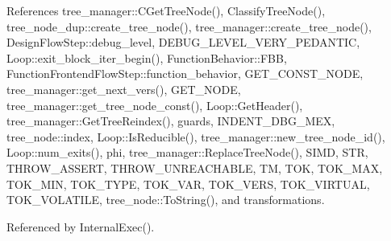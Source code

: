 References tree\+\_\+manager\+::\+C\+Get\+Tree\+Node(), Classify\+Tree\+Node(), tree\+\_\+node\+\_\+dup\+::create\+\_\+tree\+\_\+node(), tree\+\_\+manager\+::create\+\_\+tree\+\_\+node(), Design\+Flow\+Step\+::debug\+\_\+level, D\+E\+B\+U\+G\+\_\+\+L\+E\+V\+E\+L\+\_\+\+V\+E\+R\+Y\+\_\+\+P\+E\+D\+A\+N\+T\+IC, Loop\+::exit\+\_\+block\+\_\+iter\+\_\+begin(), Function\+Behavior\+::\+F\+BB, Function\+Frontend\+Flow\+Step\+::function\+\_\+behavior, G\+E\+T\+\_\+\+C\+O\+N\+S\+T\+\_\+\+N\+O\+DE, tree\+\_\+manager\+::get\+\_\+next\+\_\+vers(), G\+E\+T\+\_\+\+N\+O\+DE, tree\+\_\+manager\+::get\+\_\+tree\+\_\+node\+\_\+const(), Loop\+::\+Get\+Header(), tree\+\_\+manager\+::\+Get\+Tree\+Reindex(), guards, I\+N\+D\+E\+N\+T\+\_\+\+D\+B\+G\+\_\+\+M\+EX, tree\+\_\+node\+::index, Loop\+::\+Is\+Reducible(), tree\+\_\+manager\+::new\+\_\+tree\+\_\+node\+\_\+id(), Loop\+::num\+\_\+exits(), phi, tree\+\_\+manager\+::\+Replace\+Tree\+Node(), S\+I\+MD, S\+TR, T\+H\+R\+O\+W\+\_\+\+A\+S\+S\+E\+RT, T\+H\+R\+O\+W\+\_\+\+U\+N\+R\+E\+A\+C\+H\+A\+B\+LE, TM, T\+OK, T\+O\+K\+\_\+\+M\+AX, T\+O\+K\+\_\+\+M\+IN, T\+O\+K\+\_\+\+T\+Y\+PE, T\+O\+K\+\_\+\+V\+AR, T\+O\+K\+\_\+\+V\+E\+RS, T\+O\+K\+\_\+\+V\+I\+R\+T\+U\+AL, T\+O\+K\+\_\+\+V\+O\+L\+A\+T\+I\+LE, tree\+\_\+node\+::\+To\+String(), and transformations.



Referenced by Internal\+Exec().

